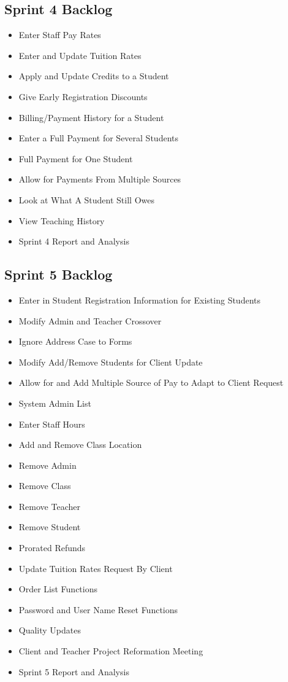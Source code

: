 \subsection{Sprint 4 Backlog}
\begin{itemize}
\item Enter Staff Pay Rates
\item Enter and Update Tuition Rates
\item Apply and Update Credits to a Student
\item Give Early Registration Discounts
\item Billing/Payment History for a Student
\item Enter a Full Payment for Several Students
\item Full Payment for One Student
\item Allow for Payments From Multiple Sources 
\item Look at What A Student Still Owes
\item View Teaching History
\item Sprint 4 Report and Analysis 
\end{itemize}

\subsection{Sprint 5 Backlog}
\begin{itemize}
\item Enter in Student Registration Information for Existing Students
\item Modify Admin and Teacher Crossover 
\item Ignore Address Case to Forms 
\item Modify Add/Remove Students for Client Update
\item Allow for and Add Multiple Source of Pay to Adapt to Client Request 
\item System Admin List
\item Enter Staff Hours 
\item Add and Remove Class Location
\item Remove Admin
\item Remove Class
\item Remove Teacher
\item Remove Student
\item Prorated Refunds
\item Update Tuition Rates Request By Client
\item Order List Functions
\item Password and User Name Reset Functions
\item Quality Updates
\item Client and Teacher Project Reformation Meeting
\item Sprint 5 Report and Analysis 
\end{itemize}

